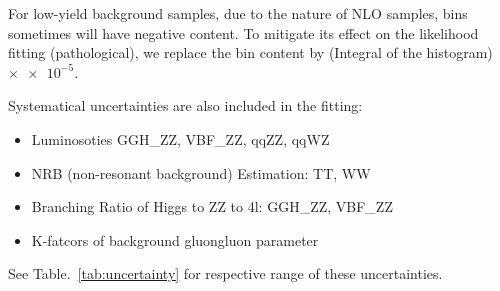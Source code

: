 For low-yield background samples, due to the nature of NLO samples, bins sometimes will have negative
content. To mitigate its effect on the likelihood fitting (pathological), we replace the bin content
by (Integral of the histogram) $\times \num{e-5}$.

Systematical uncertainties are also included in the fitting:
\begin{itemize}
    \item Luminosoties GGH\_ZZ, VBF\_ZZ, qqZZ, qqWZ
    \item NRB (non-resonant background) Estimation: TT, WW
    \item Branching Ratio of Higgs to ZZ to 4l: GGH\_ZZ, VBF\_ZZ
    \item K-fatcors of background gluongluon parameter
\end{itemize}
See Table.~\ref{tab:uncertainty} for respective range of these uncertainties.

